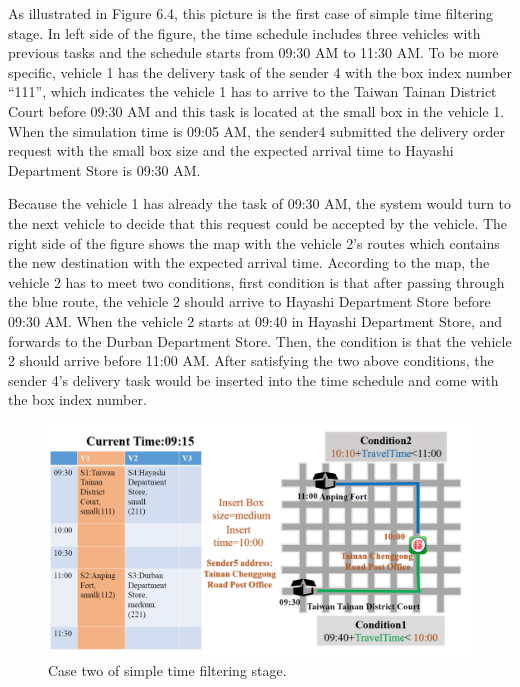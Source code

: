 \documentclass[12pt]{ksthesis}
\begin{document}
\begin{thesis}
{As illustrated in Figure 6.4, this picture is the first case of simple time filtering stage.
In left side of the figure, the time schedule includes three vehicles with previous tasks and the schedule starts from 09:30 AM to 11:30 AM. To be more specific, vehicle 1 has the delivery task of the sender 4 with the box index number “111”, which indicates the vehicle 1 has to arrive to the Taiwan Tainan District Court before 09:30 AM and this task is located at the small box in the vehicle 1.
When the simulation time is 09:05 AM, the sender4 submitted the delivery order request with the small box size and the expected arrival time to Hayashi Department Store is 09:30 AM.

Because the vehicle 1 has already the task of 09:30 AM, the system would turn to the next vehicle to decide that this request could be accepted by the vehicle.
The right side of the figure shows the map with the vehicle 2’s routes which contains the new destination with the expected arrival time.
According to the map, the vehicle 2 has to meet two conditions, first condition is that after passing through the blue route, the vehicle 2 should arrive to Hayashi Department Store before 09:30 AM. 
When the vehicle 2 starts at 09:40 in Hayashi Department Store, and forwards to the Durban Department Store. Then, the condition is that the vehicle 2 should arrive before 11:00 AM.
After satisfying the two above conditions, the sender 4’s delivery task would be inserted into the time schedule and come with the box index number. 

\begin{figure}[H]
\centering
\includegraphics[width=1.14\textwidth]{./Thesis_figures/F6-5_caseTwo_SchedulingStage.PNG}
\caption{\large Case two of simple time filtering stage.}
\vspace{0.5cm}
\label{Fig:CaseTwo_TimeFiltering}
\end{figure}

}
\end{thesis}
\end{document}
